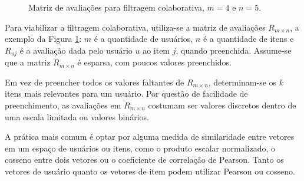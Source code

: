 \begin{figure}[h!]
    \centering
    \caption{Matriz de avaliações para filtragem colaborativa, $m=4$ e $n=5$.}
    \label{fig:ratings_matrix}
\end{figure}

Para viabilizar a filtragem colaborativa, utiliza-se a matriz de avaliações
$R_{m \times n}$, a exemplo da Figura \ref{fig:ratings_matrix}: $m$ é a quantidade de usuários, $n$ é a quantidade de
itens e $R_{uj}$ é a avaliação dada pelo usuário $u$ ao item $j$, quando
preenchida. Assume-se que a matriz $R_{m \times n}$ é esparsa, com poucos
valores preenchidos.

Em vez de preencher todos os valores faltantes de $R_{m \times n}$,
determinam-se os $k$ itens mais relevantes para um usuário. Por questão de
facilidade de preenchimento, as avaliações em $R_{m \times n}$ costumam ser
valores discretos dentro de uma escala limitada ou valores binários.

A prática mais comum é optar por alguma medida de similaridade entre vetores em
um espaço de usuários ou itens, como o produto escalar normalizado, o cosseno
entre dois vetores ou o coeficiente de correlação de Pearson. Tanto os vetores
de usuário quanto os vetores de item podem utilizar Pearson ou cosseno.

